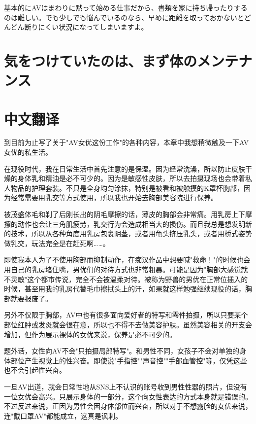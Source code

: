 \documentclass[12pt,UTF8]{ctexbook}
\begin{document}
基本的にAVはまわりに黙って始める仕事だから、書類を家に持ち帰ったりするのは難しい。でも少しでも悩んでいるのなら、早めに距離を取っておかないとどんどん断りにくい状況になってしまいますよ。

\section{気をつけていたのは、まず体のメンテナンス}

\switchcolumn

\section*{中文翻译}

到目前为止写了关于"AV女优这份工作"的各种内容，本章中我想稍微触及一下AV女优的私生活。

在现役时代，我在日常生活中首先注意的是保湿。因为经常洗澡，所以防止皮肤干燥的身体乳和精油是必不可少的。因为是敏感性皮肤，所以去拍摄现场也会带着私人物品的护理套装。不只是全身均匀涂抹，特别是被看和被触摸的K罩杯胸部，因为经常需要用乳交等方式使用，所以我也开始去胸部美容院进行保养。

被茂盛体毛和剃了后刚长出的阴毛摩擦的话，薄皮的胸部会非常痛。用乳房上下摩擦的动作也会让三角肌疲劳，乳交行为会造成相当大的损伤。而且我总是想发明新的技术，所以从各种角度用乳房包裹阴茎，或者用龟头挤压乳头，或者用桥式姿势做乳交，玩法完全是在赶死啊……。

即使我本人为了不使用胸部而抑制动作，在痴汉作品中想要喊"救命！"的时候也会用自己的乳房堵住嘴，男优们的对待方式也非常粗暴。可能是因为"胸部大感觉就不灵敏"这个都市传说，完全不会被温柔对待。被称为野兽的男优在正常位插入的时候，甚至用我的乳房代替毛巾擦拭头上的汗，如果就这样勉强继续现役的话，胸部就要报废了。

另外不仅限于胸部，AV中也有很多面向爱好者的特写和零件拍摄，所以只要某个部位红肿或发炎就会很在意，所以也不得不去做美容护肤。虽然美容相关的开支会增加，但作为展示裸体的女优来说，保养是必不可少的。

题外话，女性向AV不会"只拍摄局部特写"。和男性不同，女孩子不会对单独的身体部位产生视觉上的性兴奋。即使说"手指控""声音控""手部血管控"等，仅凭这些也不会引起性兴奋。

一旦AV出道，就会日常性地从SNS上不认识的账号收到男性性器的照片，但没有一位女优会高兴。只展示身体的一部分，这个向女性表达的方式本身就是错误的。不过反过来说，正因为男性会因身体部位而兴奋，所以对于不想露脸的女优来说，连"戴口罩AV"都能成立，这真是讽刺。

\switchcolumn
\end{document}
